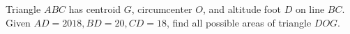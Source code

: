 Triangle $ABC$ has centroid $G$, circumcenter $O$, and altitude foot $D$ on line $BC$. Given $AD=2018,BD=20,CD=18$, find all possible areas of triangle $DOG$.
